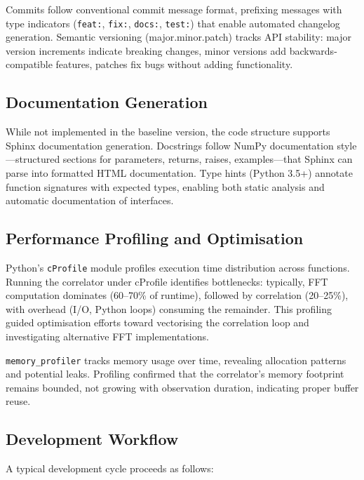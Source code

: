 Commits follow conventional commit message format, prefixing messages with type indicators (\texttt{feat:}, \texttt{fix:}, \texttt{docs:}, \texttt{test:}) that enable automated changelog generation. Semantic versioning (major.minor.patch) tracks API stability: major version increments indicate breaking changes, minor versions add backwards-compatible features, patches fix bugs without adding functionality.

\subsection{Documentation Generation}

While not implemented in the baseline version, the code structure supports Sphinx documentation generation. Docstrings follow NumPy documentation style—structured sections for parameters, returns, raises, examples—that Sphinx can parse into formatted HTML documentation. Type hints (Python 3.5+) annotate function signatures with expected types, enabling both static analysis and automatic documentation of interfaces.

\subsection{Performance Profiling and Optimisation}

Python's \texttt{cProfile} module profiles execution time distribution across functions. Running the correlator under cProfile identifies bottlenecks: typically, FFT computation dominates (60–70\% of runtime), followed by correlation (20–25\%), with overhead (I/O, Python loops) consuming the remainder. This profiling guided optimisation efforts toward vectorising the correlation loop and investigating alternative FFT implementations.

\texttt{memory\_profiler} tracks memory usage over time, revealing allocation patterns and potential leaks. Profiling confirmed that the correlator's memory footprint remains bounded, not growing with observation duration, indicating proper buffer reuse.

\subsection{Development Workflow}

A typical development cycle proceeds as follows:

